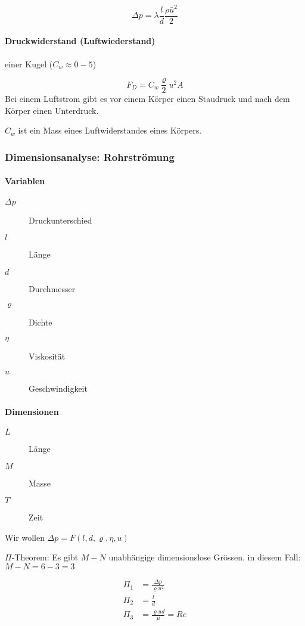 \documentclass[a4paper]{scrartcl}
\begin{document}
\[
	\Delta p = \lambda \frac{l}{d}\frac{\rho \bar{u}^2}{2}
\]






\paragraph{Druckwiderstand (Luftwiederstand)} einer Kugel ($C_w \approx 0-5$)

\[
	F_D = C_w \frac{\varrho}{2} u^2 A
\]
Bei einem Luftstrom gibt es vor einem Körper einen Staudruck und nach dem Körper einen Unterdruck.


$C_w$ ist ein Mass eines Luftwiderstandes eines Körpers.


\subsubsection{Dimensionsanalyse: Rohrströmung}
\paragraph{Variablen}
\begin{description}
	
\item[$\Delta p$] Druckunterschied
\item[$l$] Länge
\item[$d$] Durchmesser
\item[$\varrho$] Dichte
\item[$\eta$] Viskosität
\item[$u$] Geschwindigkeit
\end{description}

\paragraph{Dimensionen}
\begin{description}
	\item[$L$] Länge
	\item[$M$] Masse
	\item[$T$] Zeit
\end{description}

Wir wollen $\Delta p = F(l, d, \varrho, \eta, u)$


$\Pi$-Theorem: Es gibt $M-N$ unabhängige dimensionslose Grössen. in diesem Fall: $M-N = 6-3 = 3$

\begin{align*}
\Pi_1 &= \frac{\Delta p}{\varrho u^2} \\
\Pi_2 &= \frac{l}{d} \\
\Pi_3 &= \frac{\varrho u d}{\mu} = Re
\end{align*}
\end{document}

